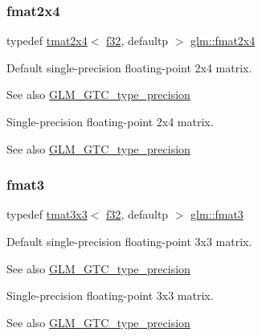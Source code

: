 \subsubsection{\texorpdfstring{fmat2x4}{fmat2x4}}
{\footnotesize\ttfamily typedef \hyperlink{structglm_1_1tmat2x4}{tmat2x4}$<$ \hyperlink{group__gtc__type__precision_ga0ec999b57f5330d9021256e96038df04}{f32}, defaultp $>$ \hyperlink{group__gtc__type__precision_ga76578ee3c2d6de9b46d0efd1c7060b85}{glm\+::fmat2x4}}

Default single-\/precision floating-\/point 2x4 matrix. \begin{DoxySeeAlso}{See also}
\hyperlink{group__gtc__type__precision}{G\+L\+M\+\_\+\+G\+T\+C\+\_\+type\+\_\+precision}
\end{DoxySeeAlso}
Single-\/precision floating-\/point 2x4 matrix. \begin{DoxySeeAlso}{See also}
\hyperlink{group__gtc__type__precision}{G\+L\+M\+\_\+\+G\+T\+C\+\_\+type\+\_\+precision} 
\end{DoxySeeAlso}
\mbox{\label{group__gtc__type__precision_ga17dec8b2e3d19b235b0749b8ac9f2217}} 
\subsubsection{\texorpdfstring{fmat3}{fmat3}}
{\footnotesize\ttfamily typedef \hyperlink{structglm_1_1tmat3x3}{tmat3x3}$<$ \hyperlink{group__gtc__type__precision_ga0ec999b57f5330d9021256e96038df04}{f32}, defaultp $>$ \hyperlink{group__gtc__type__precision_ga17dec8b2e3d19b235b0749b8ac9f2217}{glm\+::fmat3}}

Default single-\/precision floating-\/point 3x3 matrix. \begin{DoxySeeAlso}{See also}
\hyperlink{group__gtc__type__precision}{G\+L\+M\+\_\+\+G\+T\+C\+\_\+type\+\_\+precision}
\end{DoxySeeAlso}
Single-\/precision floating-\/point 3x3 matrix. \begin{DoxySeeAlso}{See also}
\hyperlink{group__gtc__type__precision}{G\+L\+M\+\_\+\+G\+T\+C\+\_\+type\+\_\+precision} 
\end{DoxySeeAlso}
\mbox{\label{group__gtc__type__precision_gab194ac1a68dbcb228384112ebe531c67}} 
